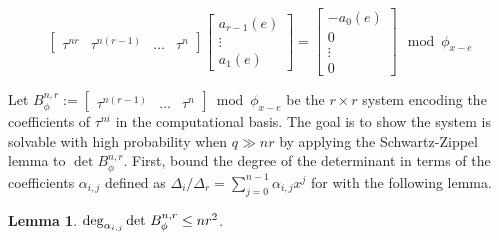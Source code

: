 \documentclass[sigconf]{acmart}
\newtheorem{lemma}{Lemma}
\begin{document}
\begin{equation}\label{system1} \begin{bmatrix}\tau^{nr} & \tau^{n(r-1)} & \ldots & \tau^{n} \end{bmatrix} \begin{bmatrix} a_{r-1}(e) \\ \vdots \\ a_1(e) \end{bmatrix} = \begin{bmatrix} - a_0(e) \\ 0 \\ \vdots \\ 0  \end{bmatrix} \mod \phi_{x-e}
\end{equation}

Let $B_{\phi}^{n,r} := \begin{bmatrix} \tau^{n(r-1)} & \ldots & \tau^{n} \end{bmatrix} \bmod \phi_{x-e}$ be the $r \times r$ system encoding the coefficients of $\tau^{ni}$ in the computational basis. The goal is to show the system is solvable with high probability when $q \gg nr$ by applying the Schwartz-Zippel lemma to $\det B_{\phi}^{n,r}$. First, bound the degree of the determinant in terms of the coefficients $\alpha_{i,j}$ defined as $ \Delta_i/\Delta_r = \sum_{j=0}^{n-1}\alpha_{i,j}x^j$ for with the following lemma.

\begin{lemma}
$\deg_{\alpha_{i,j}} \textnormal{det }  B_{\phi}^{n,r} \leq nr^2$.
\end{lemma}
\end{document}
